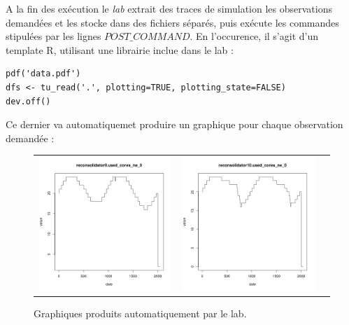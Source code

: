 \documentclass[parallelisme]{compas2017}
\begin{document}
A la fin des exécution le \emph{lab} extrait des traces de simulation les 
observations demandées et les stocke dans des fichiers séparés, puis exécute 
les commandes stipulées par les lignes \texttt{$POST\_COMMAND$}. En 
l'occurence, il s'agit d'un template R, utilisant une librairie inclue dans le 
lab :

\begin{lstlisting}
pdf('data.pdf')
dfs <- tu_read('.', plotting=TRUE, plotting_state=FALSE)
dev.off()
\end{lstlisting}

Ce dernier va automatiquemet produire un graphique pour chaque observation 
demandée :

\begin{figure}[h]
	\label{output}
	\caption{Graphiques produits automatiquement par le lab.}
	\begin{tabular}{ccc}
\includegraphics[scale=0.30]{reconsolidator0_used_cores_ne_0}&
\includegraphics[scale=0.30]{reconsolidator10_used_cores_ne_0}&

\end{tabular}
\end{figure}
\end{document}
